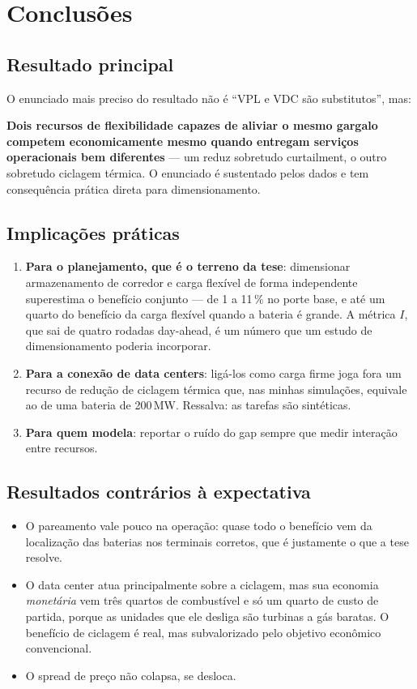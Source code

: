 \documentclass[11pt,a4paper]{article}
\begin{document}
\section{Conclusões}

\subsection{Resultado principal}

O enunciado mais preciso do resultado não é ``VPL e VDC são substitutos'', mas:

\textbf{Dois recursos de flexibilidade capazes de aliviar o mesmo gargalo competem economicamente mesmo
quando entregam serviços operacionais bem diferentes} --- um reduz sobretudo curtailment, o outro sobretudo
ciclagem térmica.
O enunciado é sustentado pelos dados e tem consequência prática direta para dimensionamento.

\subsection{Implicações práticas}

\begin{enumerate}
\item \textbf{Para o planejamento, que é o terreno da tese}: dimensionar armazenamento de corredor e carga
flexível de forma independente superestima o benefício conjunto --- de 1 a 11\,\% no porte base, e até um
quarto do benefício da carga flexível quando a bateria é grande. A métrica $I$, que sai de quatro rodadas
day-ahead, é um número que um estudo de dimensionamento poderia incorporar.
\item \textbf{Para a conexão de data centers}: ligá-los como carga firme joga fora um recurso de redução
de ciclagem térmica que, nas minhas simulações, equivale ao de uma bateria de 200\,MW. Ressalva: as tarefas são sintéticas.
\item \textbf{Para quem modela}: reportar o ruído do gap sempre que medir interação entre recursos.
\end{enumerate}

\subsection{Resultados contrários à expectativa}

\begin{itemize}
\item O pareamento vale pouco na operação: quase todo o benefício vem da localização das baterias nos
terminais corretos, que é justamente o que a tese resolve.
\item O data center atua principalmente sobre a ciclagem, mas sua economia \emph{monetária} vem três quartos de
combustível e só um quarto de custo de partida, porque as unidades que ele desliga são turbinas a gás
baratas. O benefício de ciclagem é real, mas subvalorizado pelo objetivo econômico convencional.
\item O spread de preço não colapsa, se desloca.
\end{itemize}
\end{document}
